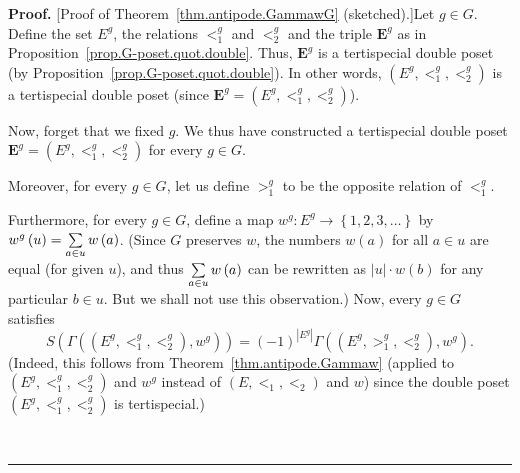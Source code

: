 \documentclass[numbers=enddot,12pt,final,onecolumn,notitlepage,abstracton]{scrartcl}%
\theoremstyle{definition}
\newenvironment{proof}[1][Proof]{\noindent\textbf{#1.} }{\ \rule{0.5em}{0.5em}}
\let\sumnonlimits\sum
\renewcommand{\sum}{\sumnonlimits\limits}
\newcommand{\EE}{{\mathbf{E}}}
\begin{document}
\begin{proof}
[Proof of Theorem~\ref{thm.antipode.GammawG} (sketched).]Let $g\in G$.
Define the set $E^g$, the relations $<_1^g$ and $<_2^g$
and the triple $\EE^g$ as in Proposition~\ref{prop.G-poset.quot.double}.
Thus, $\EE^g$ is a tertispecial double poset (by
Proposition~\ref{prop.G-poset.quot.double}). In other words,
$\left( E^g, <_1^g, <_2^g \right)$ is a tertispecial double poset
(since $\EE^g = \left( E^g, <_1^g, <_2^g \right)$).

Now, forget that we fixed $g$. We thus have constructed a
tertispecial double poset
$\EE^g = \left( E^g, <_1^g, <_2^g \right)$ for every $g \in G$.

Moreover, for every $g \in G$, let us define $>_1^g$ to be the
opposite relation of $<_1^g$.

Furthermore, for every $g\in G$, define a map $w^{g}:E^{g}\rightarrow
\left\{1,2,3,\ldots\right\}$
by $w^{g}\left(  u\right)  =\sum\limits_{a\in u}w\left(
a\right)  $. (Since $G$ preserves $w$, the numbers $w\left(  a\right)  $ for
all $a\in u$ are equal (for given $u$), and thus $\sum\limits_{a\in u}w\left(
a\right)  $ can be rewritten as $\left\vert u\right\vert \cdot w\left(
b\right)  $ for any particular $b\in u$. But we shall not use
this observation.)
Now, every $g \in G$ satisfies
\begin{equation}
S\left(  \Gamma\left(  \left(  E^{g},<_{1}^{g},<_{2}^{g}\right)
,w^{g}\right)  \right)  =\left(  -1\right)  ^{\left\vert E^{g}\right\vert
}\Gamma\left(  \left(  E^{g},>_{1}^{g},<_{2}^{g}\right)  ,w^{g}\right) .
\label{pf.thm.antipode.GammawG.S1}
\end{equation}
(Indeed, this follows from Theorem~\ref{thm.antipode.Gammaw}
(applied to $\left( E^g, <_1^g, <_2^g \right)$ and $w^g$
instead of $\left( E, <_1, <_2 \right)$ and $w$)
since the double poset
$\left( E^g, <_1^g, <_2^g \right)$ is tertispecial.)


\end{proof}
\end{document}
